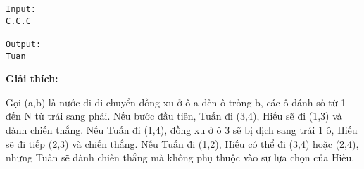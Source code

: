 \begin{verbatim}
Input:
C.C.C

Output:
Tuan

\end{verbatim}

\textbf{Giải thích:}

Gọi (a,b) là nước đi di chuyển đồng xu ở ô a đến ô trống b, các ô đánh số từ 1 đến N từ trái sang phải. Nếu bước đầu tiên, Tuấn đi (3,4), Hiếu sẽ đi (1,3) và dành chiến thắng. Nếu Tuấn đi (1,4), đồng xu ở ô 3 sẽ bị dịch sang trái 1 ô, Hiếu sẽ đi tiếp (2,3) và chiến thắng. Nếu Tuấn đi (1,2), Hiếu có thể đi (3,4) hoặc (2,4), nhưng Tuấn sẽ dành chiến thắng mà không phụ thuộc vào sự lựa chọn của Hiếu.
